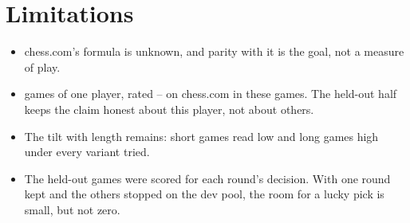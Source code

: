 \documentclass[11pt]{article}
\begin{document}
\begin{table}[!htbp]
\centering\small
\ReproTable
\caption{The recorded numbers beside the lab's rerun on rebuilt evidence.}
\label{tab:repro}
\end{table}

\section{Limitations}

\begin{itemize}[nosep]
\item chess.com's formula is unknown, and parity with it is the goal, not a measure of play.
\item \Games{} games of one player, rated \PlayerRatingMin--\PlayerRatingMax{} on chess.com in
these games. The held-out half keeps the claim honest about this player, not about others.
\item The tilt with length remains: short games read low and long games high under every
variant tried.
\item The held-out games were scored for each round's decision. With one round kept and the
others stopped on the dev pool, the room for a lucky pick is small, but not zero.
\end{itemize}
\end{document}

